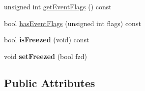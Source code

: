 \begin{DoxyCompactItemize}
unsigned int \hyperlink{structPUParticle3D_af1eea76d75ae71217e6b3c6992c76e3b}{get\+Event\+Flags} () const
\item 
bool \hyperlink{structPUParticle3D_ac66551a0117e3a867f58a34bb228aefb}{has\+Event\+Flags} (unsigned int flags) const
\item 
\mbox{\label{structPUParticle3D_ac43d1df7e80b687621a6168936c4a9b9}} 
bool {\bfseries is\+Freezed} (void) const
\item 
\mbox{\label{structPUParticle3D_a4242b864dccf46159ce1c86c9e7b3ab7}} 
void {\bfseries set\+Freezed} (bool fzd)
\end{DoxyCompactItemize}
\subsection*{Public Attributes}
